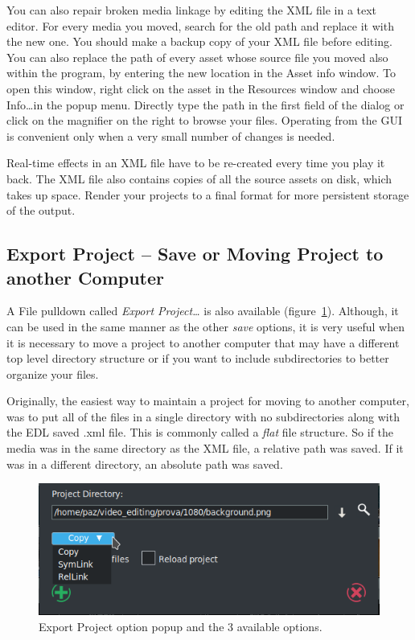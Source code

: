 You can also repair broken media linkage by editing the XML file in a text editor. For every media you moved, search for the old path and replace it with the new one. You should make a backup copy of your XML file before editing. You can also replace the path of every asset whose source file you moved also within the program, by entering the new location in the Asset info window. To open this window, right click on the asset in the Resources window and choose Info\dots in the popup menu. Directly type the path in the first field of the dialog or click on the magnifier on the right to browse your files. Operating
from the GUI is convenient only when a very small number of changes is needed.

Real-time effects in an XML file have to be re-created every time you play it back. The XML file also contains copies of all the source assets on disk, which takes up space.  Render your projects to a final format for more persistent storage of the output.

\subsection{Export Project – Save or Moving Project to another Computer}%
\label{sub:export_project}

A File pulldown called \textit{Export Project\dots} is also available (figure~\ref{fig:export}).  Although, it can be used in the same manner as the other \textit{save} options, it is very useful when it is necessary to move a project to another computer that may have a different top level directory structure or if you want to include subdirectories to better organize your files.  

Originally, the easiest way to maintain a project for moving to another computer, was to put all of the files in a single directory with no subdirectories along with the EDL saved .xml file.   This is commonly called a \textit{flat} file structure.  So if the media was in the same directory as the XML file, a relative path was saved.  If it was in a different directory, an absolute path was saved.

\begin{figure}[htpb]
    \centering
    \includegraphics[width=0.6\linewidth]{images/export.png}
    \caption{Export Project option popup and the 3         available options.}
    \label{fig:export}
\end{figure}

